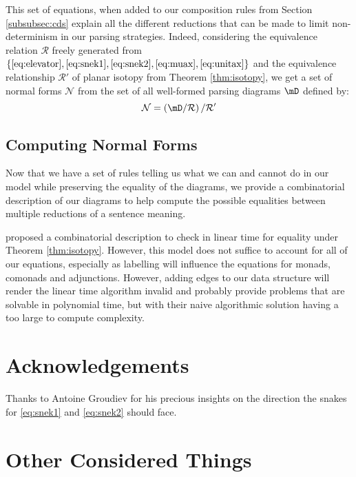 \documentclass[math, english, info]{cours}
\begin{document}
This set of equations, when added to our composition rules from Section \ref{subsubsec:cds} explain all the different reductions that can be made to limit non-determinism in our parsing strategies.
Indeed, considering the equivalence relation $\mathcal{R}$ freely generated from $\left\{ \eqref{eq:elevator}, \eqref{eq:snek1}, \eqref{eq:snek2}, \eqref{eq:muax}, \eqref{eq:unitax} \right\}$ and the equivalence relationship $\mathcal{R}'$ of planar isotopy from Theorem \ref{thm:isotopy}, we get a set of normal forms $\mathcal{N}$ from the set of all well-formed parsing diagrams $\mD$ defined by:
\begin{equation*}
	\mathcal{N} = \left( \mD / \mathcal{R} \right) / \mathcal{R}'
\end{equation*}

\subsection{Computing Normal Forms}
Now that we have a set of rules telling us what we can and cannot do in our model while preserving the equality of the diagrams, we provide a combinatorial description of our diagrams to help compute the possible equalities between multiple reductions of a sentence meaning.

 proposed a combinatorial description to check
in linear time for equality under Theorem \ref{thm:isotopy}.
However, this model does not suffice to account for all of our equations, especially as
labelling will influence the equations for monads, comonads and adjunctions.
However, adding edges to our data structure will render the linear time algorithm invalid and
probably provide problems that are solvable in polynomial time, but with their naive
algorithmic solution having a too large to compute complexity.

\section*{Acknowledgements}
Thanks to Antoine Groudiev for his precious insights on the direction the snakes for \eqref{eq:snek1} and \eqref{eq:snek2} should face.
\clearpage
\appendix
\section{Other Considered Things}
\end{document}
